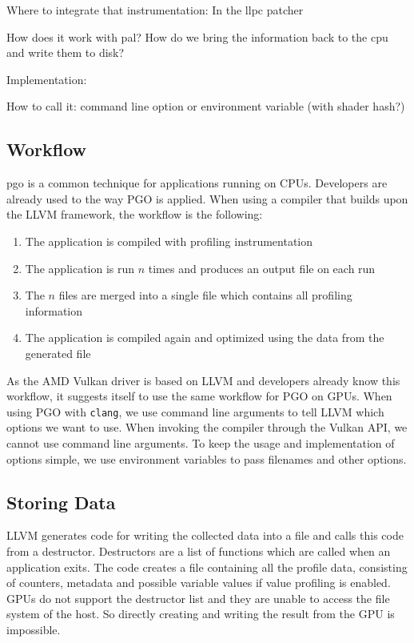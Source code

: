 \clearpage
{}
Where to integrate that instrumentation: In the llpc patcher

How does it work with pal?
How do we bring the information back to the cpu and write them to disk?

Implementation:

How to call it: command line option or environment variable (with shader hash?)

\subsection{Workflow}
\label{sub:workflow}
\Gls{pgo} is a common technique for applications running on CPUs.
Developers are already used to the way PGO is applied.
When using a compiler that builds upon the LLVM framework, the workflow is the following:
\begin{enumerate}
	\item The application is compiled with profiling instrumentation
	\item The application is run $n$ times and produces an output file on each run
	\item The $n$ files are merged into a single file which contains all profiling information
	\item The application is compiled again and optimized using the data from the generated file
\end{enumerate}
As the AMD Vulkan driver is based on LLVM and developers already know this workflow, it suggests itself to use the same workflow for PGO on GPUs.
When using PGO with \texttt{clang}, we use command line arguments to tell LLVM which options we want to use. When invoking the compiler through the Vulkan API, we cannot use command line arguments.
To keep the usage and implementation of options simple, we use environment variables to pass filenames and other options.

\subsection{Storing Data}
\label{sub:save-design}
LLVM generates code for writing the collected data into a file and calls this code from a destructor.
Destructors are a list of functions which are called when an application exits.
The code creates a file containing all the profile data, consisting of counters, metadata and possible variable values if value profiling is enabled.
GPUs do not support the destructor list and they are unable to access the file system of the host.
So directly creating and writing the result from the GPU is impossible.

